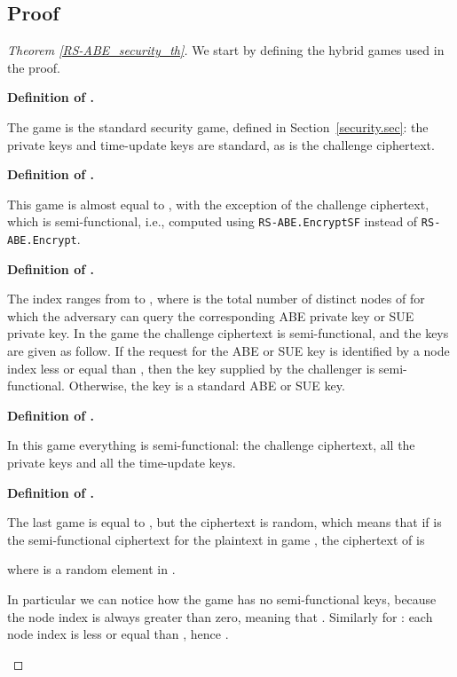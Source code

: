 \documentclass[a4paper,10pt]{article}
\newcommand{\algorithm}[2]{\texttt{#1.#2}}
\newcommand{\game}[2]{}
\newcommand{\gamedef}[3]{
\textbf{Definition of \game{#1}{#2}.}
#3}
\begin{document}
	\subsection{Proof}
	\begin{proof}[Theorem \ref{RS-ABE_security_th}]
		We start by defining the hybrid games used in the proof. 

		\gamedef{G}{0}{
		The game \game{G}{0} is the standard security game, defined in Section~\ref{security.sec}: the private keys and time-update keys are standard, as is the challenge ciphertext.
		}
		
		\gamedef{G}{1}{
		This game is almost equal to \game{G}{0}, with the exception of the challenge ciphertext, which is semi-functional, i.e., computed using \algorithm{RS-ABE}{EncryptSF} instead of \algorithm{RS-ABE}{Encrypt}.
		}
		
 		\gamedef{G}{1,h}{
 		The index  ranges from  to , where  is the total number of distinct nodes of  for which the adversary can query the corresponding ABE private key or SUE private key.
 		In the game \game{G}{1,h} the challenge ciphertext is semi-functional, and the keys are given as follow.
If the request for the ABE or SUE key is identified by a node index  less or equal than , then the key supplied by the challenger is semi-functional.
Otherwise, the key is a standard ABE or SUE key.
}
		
		\gamedef{G}{2}{
		In this game everything is semi-functional: the challenge ciphertext, all the private keys and all the time-update keys.
		}
		
		\gamedef{G}{3}{
		The last game is equal to \game{G}{2}, but the ciphertext is random, which means that if 
		 is the semi-functional ciphertext for the plaintext  in game \game{G}{2}, the ciphertext of \game{G}{3} is 
		
		where  is a random element in .
		}
		
		In particular we can notice how the game \game{G}{1,0} has no semi-functional keys, because the node index is always greater than zero, meaning that . Similarly for \game{G}{1,q_n}: each node index is less or equal than , hence .
	
	\vspace{-1em} \begin{table}[H]
		\begin{center}
\end{center}
\end{table}
\end{proof}
\end{document}
